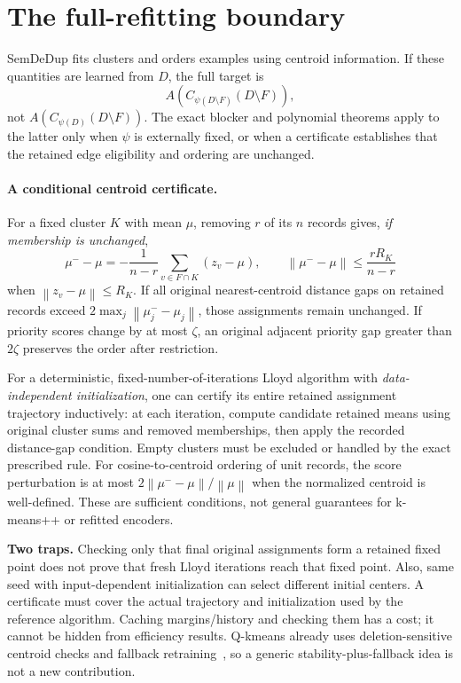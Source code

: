 \documentclass[11pt,a4paper]{article}
\theoremstyle{definition}\newtheorem{definition}[theorem]{Definition}
\newcommand{\norm}[1]{\left\lVert #1\right\rVert}
\newcommand{\minus}{\setminus}
\begin{document}
\section{The full-refitting boundary}\label{sec:refit}
SemDeDup fits clusters and orders examples using centroid information. If these quantities are learned from $D$, the full target is
\[
 A\!\left(C_{\psi(D\minus F)}(D\minus F)\right),
\]
not $A(C_{\psi(D)}(D\minus F))$. The exact blocker and polynomial theorems apply to the latter only when $\psi$ is externally fixed, or when a certificate establishes that the retained edge eligibility and ordering are unchanged.

\paragraph{A conditional centroid certificate.} For a fixed cluster $K$ with mean $\mu$, removing $r$ of its $n$ records gives, \emph{if membership is unchanged},
\[
 \mu^- -\mu=-\frac1{n-r}\sum_{v\in F\cap K}(z_v-\mu),\qquad
 \norm{\mu^- -\mu}\le\frac{rR_K}{n-r}
\]
when $\norm{z_v-\mu}\le R_K$. If all original nearest-centroid distance gaps on retained records exceed $2\max_j\norm{\mu_j^--\mu_j}$, those assignments remain unchanged. If priority scores change by at most $\zeta$, an original adjacent priority gap greater than $2\zeta$ preserves the order after restriction.

For a deterministic, fixed-number-of-iterations Lloyd algorithm with \emph{data-independent initialization}, one can certify its entire retained assignment trajectory inductively: at each iteration, compute candidate retained means using original cluster sums and removed memberships, then apply the recorded distance-gap condition. Empty clusters must be excluded or handled by the exact prescribed rule. For cosine-to-centroid ordering of unit records, the score perturbation is at most $2\norm{\mu^- -\mu}/\norm\mu$ when the normalized centroid is well-defined. These are sufficient conditions, not general guarantees for k-means++ or refitted encoders.

\textbf{Two traps.} Checking only that final original assignments form a retained fixed point does not prove that fresh Lloyd iterations reach that fixed point. Also, same seed with input-dependent initialization can select different initial centers. A certificate must cover the actual trajectory and initialization used by the reference algorithm. Caching margins/history and checking them has a cost; it cannot be hidden from efficiency results. Q-kmeans already uses deletion-sensitive centroid checks and fallback retraining~\cite{ginart2019}, so a generic stability-plus-fallback idea is not a new contribution.
\end{document}
